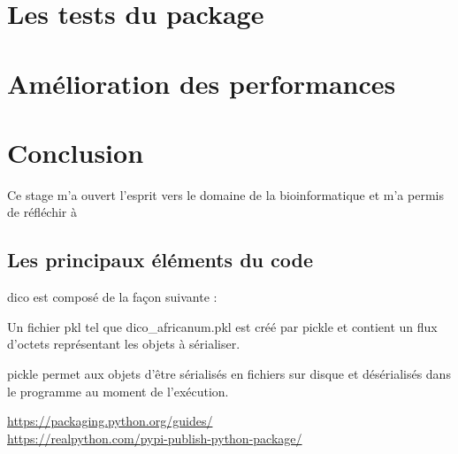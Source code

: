 \documentclass[twoside,a4paper,11pt,frenchb,openany]{report}
\begin{document}
\chapter{Les tests du package}





\chapter{Amélioration des performances}


\chapter*{Conclusion}

Ce stage m'a ouvert l'esprit vers le domaine de la bioinformatique et m'a permis de réfléchir à 

	
	

	


\section{Les principaux éléments du code}

dico est composé de la façon suivante :

Un fichier pkl tel que dico\_africanum.pkl est créé par pickle et contient un flux d'octets représentant les objets à sérialiser.

pickle permet aux objets d'être sérialisés en fichiers sur disque et désérialisés dans le programme au moment de l'exécution.
	
	\begin{spacing}{0.5}
		
		\renewcommand{\bibname}{Références}
		\begin{thebibliography}{10}
			\href{https://packaging.python.org/guides/}{https://packaging.python.org/guides/}\\

\href{https://realpython.com/pypi-publish-python-package/}{https://realpython.com/pypi-publish-python-package/}
			
		\end{thebibliography}
	\end{spacing}



\printindex
\end{document}
